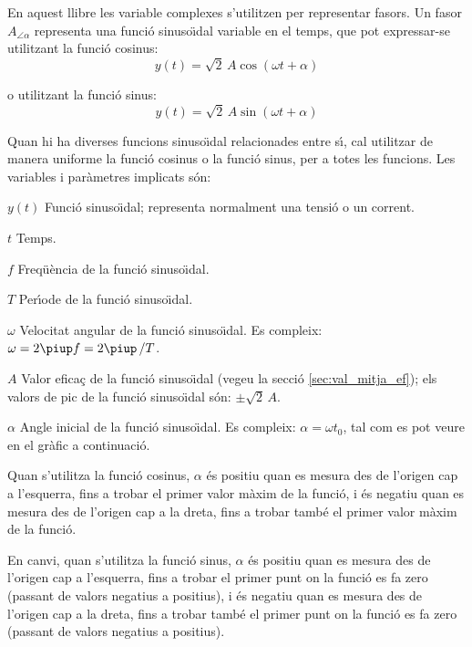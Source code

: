 \pagebreak

En aquest llibre les variable complexes s'utilitzen per representar fasors. Un fasor $A_{\angle \alpha}$ representa una funci\'{o} sinuso\"{\i}dal variable en el temps, que pot expressar-se utilitzant la funci\'{o} cosinus:
\[y(t)=\sqrt{2}\, A \cos(\omega t + \alpha)\]

o utilitzant la funci\'{o} sinus:
\[y(t)=\sqrt{2}\, A \sin(\omega t + \alpha)\]

Quan hi ha diverses funcions sinuso\"{\i}dal relacionades entre s\'{\i}, cal utilitzar de manera uniforme la funci\'{o} cosinus o la funci\'{o} sinus, per a totes les funcions. Les variables i par\`{a}metres implicats s\'{o}n:
\begin{list}{}
{\setlength{\labelwidth}{15mm} \setlength{\leftmargin}{20mm}
\setlength{\labelsep}{5mm}}
    \item[$y(t)$] Funci\'{o} sinuso\"{\i}dal; representa normalment una tensi\'{o} o un corrent.
    \item[$t$] Temps.
    \item[$f$] Freq\"{u}\`{e}ncia de la funci\'{o} sinuso\"{\i}dal.
    \item[$T$] Per\'{\i}ode de la funci\'{o} sinuso\"{\i}dal.
    \item[$\omega$] Velocitat angular de la funci\'{o} sinuso\"{\i}dal. Es compleix: $\omega = 2 \piup f = 2 \piup\,/T$.
    \item[$A$] Valor efica\c{c} de la funci\'{o} sinuso\"{\i}dal (vegeu la secci\'{o} \vref{sec:val_mitja_ef}); els valors de pic de la funci\'{o} sinuso\"{\i}dal  s\'{o}n:  $\pm\sqrt{2}\, A$.
    \item[$\alpha$] Angle inicial de la funci\'{o} sinuso\"{\i}dal. Es compleix:  $\alpha=\omega t_0$, tal com es pot veure en el gr\`{a}fic a continuaci\'{o}.

    Quan s'utilitza la funci\'{o} cosinus, $\alpha$ \'{e}s positiu quan es mesura des de l'origen cap a l'esquerra, fins a trobar el primer valor m\`{a}xim de la funci\'{o}, i \'{e}s negatiu quan es mesura des de l'origen cap a la dreta, fins a trobar tamb\'{e} el primer valor m\`{a}xim de la funci\'{o}.

    En canvi, quan s'utilitza la funci\'{o} sinus, $\alpha$ \'{e}s positiu quan es mesura des de l'origen cap a l'esquerra, fins a trobar el primer punt on la funci\'{o} es fa zero (passant de valors negatius a positius), i \'{e}s negatiu quan es mesura des de l'origen cap a la dreta, fins a trobar tamb\'{e} el primer punt on la funci\'{o} es fa zero (passant de valors negatius a positius).
    \item[] 
\end{list}

